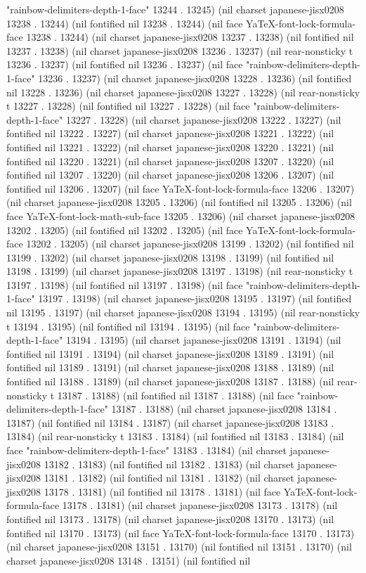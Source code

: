 "rainbow-delimiters-depth-1-face" 13244 . 13245) (nil charset japanese-jisx0208 13238 . 13244) (nil fontified nil 13238 . 13244) (nil face YaTeX-font-lock-formula-face 13238 . 13244) (nil charset japanese-jisx0208 13237 . 13238) (nil fontified nil 13237 . 13238) (nil charset japanese-jisx0208 13236 . 13237) (nil rear-nonsticky t 13236 . 13237) (nil fontified nil 13236 . 13237) (nil face "rainbow-delimiters-depth-1-face" 13236 . 13237) (nil charset japanese-jisx0208 13228 . 13236) (nil fontified nil 13228 . 13236) (nil charset japanese-jisx0208 13227 . 13228) (nil rear-nonsticky t 13227 . 13228) (nil fontified nil 13227 . 13228) (nil face "rainbow-delimiters-depth-1-face" 13227 . 13228) (nil charset japanese-jisx0208 13222 . 13227) (nil fontified nil 13222 . 13227) (nil charset japanese-jisx0208 13221 . 13222) (nil fontified nil 13221 . 13222) (nil charset japanese-jisx0208 13220 . 13221) (nil fontified nil 13220 . 13221) (nil charset japanese-jisx0208 13207 . 13220) (nil fontified nil 13207 . 13220) (nil charset japanese-jisx0208 13206 . 13207) (nil fontified nil 13206 . 13207) (nil face YaTeX-font-lock-formula-face 13206 . 13207) (nil charset japanese-jisx0208 13205 . 13206) (nil fontified nil 13205 . 13206) (nil face YaTeX-font-lock-math-sub-face 13205 . 13206) (nil charset japanese-jisx0208 13202 . 13205) (nil fontified nil 13202 . 13205) (nil face YaTeX-font-lock-formula-face 13202 . 13205) (nil charset japanese-jisx0208 13199 . 13202) (nil fontified nil 13199 . 13202) (nil charset japanese-jisx0208 13198 . 13199) (nil fontified nil 13198 . 13199) (nil charset japanese-jisx0208 13197 . 13198) (nil rear-nonsticky t 13197 . 13198) (nil fontified nil 13197 . 13198) (nil face "rainbow-delimiters-depth-1-face" 13197 . 13198) (nil charset japanese-jisx0208 13195 . 13197) (nil fontified nil 13195 . 13197) (nil charset japanese-jisx0208 13194 . 13195) (nil rear-nonsticky t 13194 . 13195) (nil fontified nil 13194 . 13195) (nil face "rainbow-delimiters-depth-1-face" 13194 . 13195) (nil charset japanese-jisx0208 13191 . 13194) (nil fontified nil 13191 . 13194) (nil charset japanese-jisx0208 13189 . 13191) (nil fontified nil 13189 . 13191) (nil charset japanese-jisx0208 13188 . 13189) (nil fontified nil 13188 . 13189) (nil charset japanese-jisx0208 13187 . 13188) (nil rear-nonsticky t 13187 . 13188) (nil fontified nil 13187 . 13188) (nil face "rainbow-delimiters-depth-1-face" 13187 . 13188) (nil charset japanese-jisx0208 13184 . 13187) (nil fontified nil 13184 . 13187) (nil charset japanese-jisx0208 13183 . 13184) (nil rear-nonsticky t 13183 . 13184) (nil fontified nil 13183 . 13184) (nil face "rainbow-delimiters-depth-1-face" 13183 . 13184) (nil charset japanese-jisx0208 13182 . 13183) (nil fontified nil 13182 . 13183) (nil charset japanese-jisx0208 13181 . 13182) (nil fontified nil 13181 . 13182) (nil charset japanese-jisx0208 13178 . 13181) (nil fontified nil 13178 . 13181) (nil face YaTeX-font-lock-formula-face 13178 . 13181) (nil charset japanese-jisx0208 13173 . 13178) (nil fontified nil 13173 . 13178) (nil charset japanese-jisx0208 13170 . 13173) (nil fontified nil 13170 . 13173) (nil face YaTeX-font-lock-formula-face 13170 . 13173) (nil charset japanese-jisx0208 13151 . 13170) (nil fontified nil 13151 . 13170) (nil charset japanese-jisx0208 13148 . 13151) (nil fontified nil 